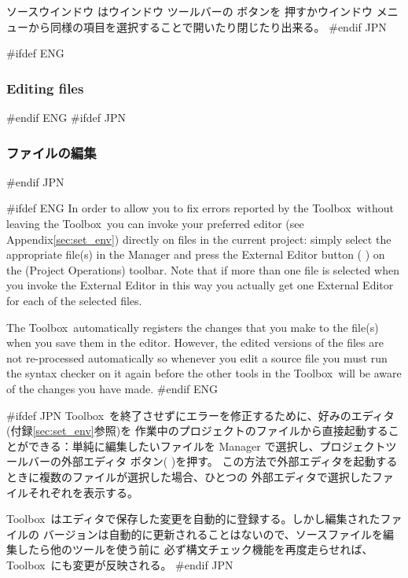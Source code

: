 \documentclass[\pformat,12pt]{article}
\newcommand{\Toolbox}{Toolbox}
\newcommand{\Toolbox}{Toolbox}
\newcommand{\guicmd}[1]{{\sf #1}}
\newcommand{\guicmd}[1]{{\gt #1}}
\begin{document}
\guicmd{ソースウインドウ} は\guicmd{ウインドウ} ツールバーの
ボタンを
押すか\guicmd{ウインドウ} メニューから同様の項目を選択することで開いたり閉じたり出来る。
#endif JPN

#ifdef ENG
\subsubsection{Editing files}
#endif ENG
#ifdef JPN
\subsubsection{ファイルの編集}
#endif JPN

#ifdef ENG
In order to allow you to fix errors reported by the \Toolbox\ without
leaving the \Toolbox\ you can invoke your preferred editor (see
Appendix\ref{sec:set_env}) directly on files in the current project:
simply select the appropriate file(s) in the \guicmd{Manager} and
press the \guicmd{External Editor} button (%
) 
on the (\guicmd{Project Operations}) toolbar. Note that if more than
one file is selected when you invoke the \guicmd{External Editor} in
this way you actually get one \guicmd{External Editor} for each of the
selected files.

The \Toolbox\ automatically registers the changes that you make to the
file(s) when you save them in the editor. However, the edited versions
of the files are not re-processed automatically so whenever you edit a
source file you must run the syntax checker on it again before the
other tools in the \Toolbox\ will be aware of the changes you have
made.
#endif ENG

#ifdef JPN
\Toolbox\ を終了させずにエラーを修正するために、好みのエディタ(付録\ref{sec:set_env}参照)を
作業中のプロジェクトのファイルから直接起動することができる：単純に編集したいファイルを
\guicmd{Manager} で選択し、\guicmd{プロジェクト}ツールバーの\guicmd{外部エディタ}
 ボタン(%
)を押す。
この方法で\guicmd{外部エディタ}を起動するときに複数のファイルが選択した場合、ひとつの
\guicmd{外部エディタ}で選択したファイルそれぞれを表示する。

\Toolbox\ はエディタで保存した変更を自動的に登録する。しかし編集されたファイルの
バージョンは自動的に更新されることはないので、ソースファイルを編集したら他のツールを使う前に
必ず構文チェック機能を再度走らせれば、\Toolbox\ にも変更が反映される。
#endif JPN
\end{document}
